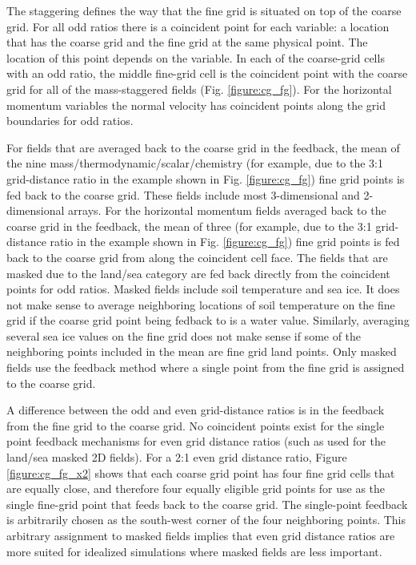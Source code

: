 The staggering defines the way that the fine grid is situated 
on top of the coarse grid.  For all odd ratios there is a coincident 
point for each variable: a location that has the coarse grid 
and the fine grid at the same physical point.  The location of 
this point depends on the variable. 
In each of the 
coarse-grid cells with an odd ratio, the middle fine-grid cell
is the coincident point with the coarse grid for all of the 
mass-staggered fields (Fig. \ref{figure:cg_fg}).  
For the horizontal momentum variables
the normal velocity has coincident points along the grid boundaries for odd ratios.

For fields 
that are averaged back to the coarse grid in the feedback, the 
mean of the nine mass/thermodynamic/scalar/chemistry (for example, due to the 3:1 grid-distance ratio
in the example shown in Fig. \ref{figure:cg_fg}) fine grid 
points is fed back to the coarse grid.  These fields include most
3-dimensional and 2-dimensional arrays.  
For the horizontal momentum fields averaged back to the coarse grid in the 
feedback, the mean of three (for example, due to the 3:1 grid-distance ratio
in the example shown in Fig. \ref{figure:cg_fg}) fine grid
points is fed back to the coarse grid from along the coincident cell face.
The fields that are masked due 
to the land/sea category are fed back directly from the coincident points 
for odd ratios.  Masked fields include soil temperature and sea ice.  It does not make 
sense to average neighboring locations of soil temperature on the fine grid 
if the coarse grid point being fedback to is a water value.  Similarly, averaging
several sea ice values on the fine grid does not make sense if some of the neighboring
points included in the mean are fine grid land points. 
Only masked fields use the feedback method where a single
point from the fine grid is assigned to the coarse grid.

A difference between the odd and even grid-distance ratios 
is in the feedback from the fine grid to the coarse grid.  No 
coincident points exist for the single point feedback mechanisms
for even grid distance ratios
(such as used for the land/sea masked 2D fields).  
For a 2:1 even grid distance ratio, Figure
\ref{figure:cg_fg_x2} shows that each coarse 
grid point has four fine grid cells that are equally close,
and therefore four equally eligible grid points for use as the 
single fine-grid point that feeds back to the coarse grid.  The 
single-point feedback is arbitrarily chosen as the south-west 
corner of the four neighboring points.
This arbitrary assignment to masked fields implies that even
grid distance ratios are more suited for idealized simulations
where masked fields are less important.



